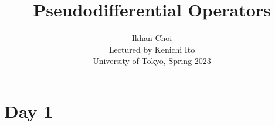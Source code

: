 \documentclass{../../small}
\begin{document}
\title{Pseudodifferential Operators}
\author{Ikhan Choi\\Lectured by Kenichi Ito\\University of Tokyo, Spring 2023}
\maketitle
\tableofcontents

\newpage
\section{Day 1}
\end{document}
